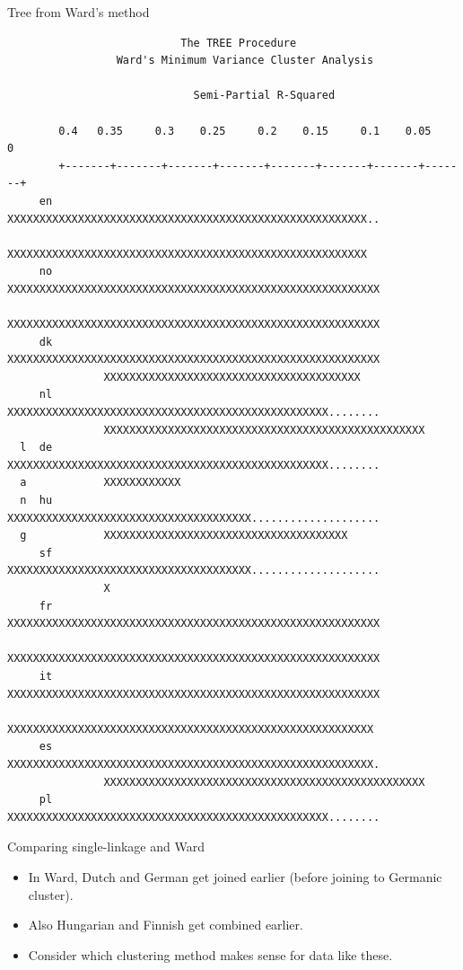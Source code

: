 \documentclass[pdf]{prosper}
\begin{document}
\begin{slide}{Tree from Ward's method}

{\tiny
\begin{verbatim}
                           The TREE Procedure
                 Ward's Minimum Variance Cluster Analysis

                             Semi-Partial R-Squared

        0.4   0.35     0.3    0.25     0.2    0.15     0.1    0.05      0
        +-------+-------+-------+-------+-------+-------+-------+-------+
     en        XXXXXXXXXXXXXXXXXXXXXXXXXXXXXXXXXXXXXXXXXXXXXXXXXXXXXXXX..
               XXXXXXXXXXXXXXXXXXXXXXXXXXXXXXXXXXXXXXXXXXXXXXXXXXXXXXXX
     no        XXXXXXXXXXXXXXXXXXXXXXXXXXXXXXXXXXXXXXXXXXXXXXXXXXXXXXXXXX
               XXXXXXXXXXXXXXXXXXXXXXXXXXXXXXXXXXXXXXXXXXXXXXXXXXXXXXXXXX
     dk        XXXXXXXXXXXXXXXXXXXXXXXXXXXXXXXXXXXXXXXXXXXXXXXXXXXXXXXXXX
               XXXXXXXXXXXXXXXXXXXXXXXXXXXXXXXXXXXXXXXX
     nl        XXXXXXXXXXXXXXXXXXXXXXXXXXXXXXXXXXXXXXXXXXXXXXXXXX........
               XXXXXXXXXXXXXXXXXXXXXXXXXXXXXXXXXXXXXXXXXXXXXXXXXX
  l  de        XXXXXXXXXXXXXXXXXXXXXXXXXXXXXXXXXXXXXXXXXXXXXXXXXX........
  a            XXXXXXXXXXXX
  n  hu        XXXXXXXXXXXXXXXXXXXXXXXXXXXXXXXXXXXXXX....................
  g            XXXXXXXXXXXXXXXXXXXXXXXXXXXXXXXXXXXXXX
     sf        XXXXXXXXXXXXXXXXXXXXXXXXXXXXXXXXXXXXXX....................
               X
     fr        XXXXXXXXXXXXXXXXXXXXXXXXXXXXXXXXXXXXXXXXXXXXXXXXXXXXXXXXXX
               XXXXXXXXXXXXXXXXXXXXXXXXXXXXXXXXXXXXXXXXXXXXXXXXXXXXXXXXXX
     it        XXXXXXXXXXXXXXXXXXXXXXXXXXXXXXXXXXXXXXXXXXXXXXXXXXXXXXXXXX
               XXXXXXXXXXXXXXXXXXXXXXXXXXXXXXXXXXXXXXXXXXXXXXXXXXXXXXXXX
     es        XXXXXXXXXXXXXXXXXXXXXXXXXXXXXXXXXXXXXXXXXXXXXXXXXXXXXXXXX.
               XXXXXXXXXXXXXXXXXXXXXXXXXXXXXXXXXXXXXXXXXXXXXXXXXX
     pl        XXXXXXXXXXXXXXXXXXXXXXXXXXXXXXXXXXXXXXXXXXXXXXXXXX........

\end{verbatim}
}
  
\end{slide}

\begin{slide}{Comparing single-linkage and Ward}

  \begin{itemize}
  \item In Ward, Dutch and German get joined earlier (before joining to Germanic cluster).
  \item Also Hungarian and Finnish get combined earlier.
  \item Consider which clustering method makes sense for data like these.
  \end{itemize}
  
\end{slide}
\end{document}
